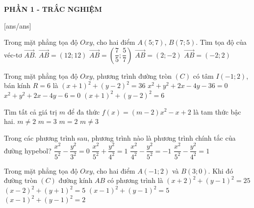 
\begin{center}
	\textbf{PHẦN 1 - TRẮC NGHIỆM}
\end{center}
[ans/ans]
\begin{ex}%
	Trong mặt phẳng tọa độ $Oxy$, cho hai điểm $A(5;7)$, $B(7;5)$. Tìm tọa độ của véc-tơ $\vec{AB}$.
	\choice
	{$\vec{AB}=(12;12)$}
	{$\vec{AB}=\left(\dfrac{7}{5};\dfrac{5}{7}\right)$}
	{\True $\vec{AB}=(2;-2)$}
	{$\vec{AB}=(-2;2)$}
\end{ex}
\begin{ex}%
	Trong mặt phẳng tọa độ $Oxy$, phương trình đường tròn $(C)$ có tâm $I(-1;2)$, bán kính $R=6$ là
	\choice
	{\True $(x+1)^2+(y-2)^2=36$}
	{$x^2+y^2+2x-4y-36=0$}
	{$x^2+y^2+2x-4y-6=0$}
	{$(x+1)^2+(y-2)^2=6$}
\end{ex}
\begin{ex}%
	Tìm tất cả giá trị $m$ để đa thức $f(x)=(m-2)x^2-x+2$ là tam thức bậc hai.
	\choice
	{\True $m\ne 2$}
	{$m=3$}
	{$m=2$}
	{$m\ne 3$}
\end{ex}
\begin{ex}%
	Trong các phương trình sau, phương trình nào là phương trình chính tắc của đường hypebol?
	\choice
	{$\dfrac{x^2}{5^2}-\dfrac{y^2}{3^2}=0$}
	{$\dfrac{x^2}{5^2}+\dfrac{y^2}{4^2}=1$}
	{$\dfrac{x^2}{4^2}-\dfrac{y^2}{5^2}=-1$}
	{\True $\dfrac{x^2}{5^2}-\dfrac{y^2}{4^2}=1$}
\end{ex}
\begin{ex}%
	Trong mặt phẳng tọa độ $Oxy$, cho hai điểm $A(-1;2)$ và $B(3;0)$. Khi đó đường tròn $(C)$ đường kính $AB$ có phương trình là
	\choice
	{$(x+2)^2+(y-1)^2=25$}
	{$(x-2)^2+(y+1)^2=5$}
	{\True $(x-1)^2+(y-1)^2=5$}
	{$(x-1)^2+(y-1)^2=2$}
\end{ex}
